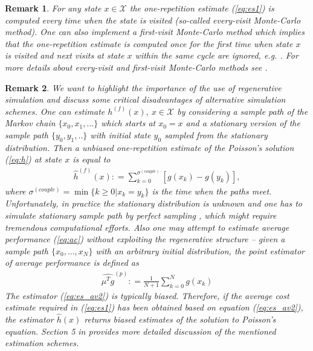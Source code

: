 \documentclass[11pt]{article}
\newcommand{\X}{\mathcal{X}}
\newtheorem{remark}{Remark}
\theoremstyle{definition}
\numberwithin{equation}{section}
\begin{document}
\begin{remark}
For any state $x\in \X$ the one-repetition estimate (\ref{eq:es1}) is computed every time when the state is visited (so-called \textit{every-visit} Monte-Carlo method). One can also implement a \textit{first-visit}  Monte-Carlo method which implies that the one-repetition estimate is computed once for the first time when state $x$ is visited and next visits at state $x$ within the same cycle are ignored, e.g. \cite{Cao1999}. For more details about every-visit and first-visit Monte-Carlo methods see \cite[Section 5.1]{Sutton2018}.
\end{remark}


\begin{remark}
We want to highlight the importance of the use of  regenerative simulation  and discuss some critical disadvantages of alternative simulation schemes.  One can estimate  $h^{(f)}(x),~x\in \X$  by considering a sample path of the Markov chain $\{x_0, x_1, ...\}$ which starts at $x_0 = x$  and a stationary version of the sample path $\{y_0, y_1, ..\}$ with initial state $y_0$ sampled from the stationary distribution. Then a unbiased one-repetition estimate of the Poisson's solution  (\ref{eq:h})  at state $x$ is equal to
\begin{align*}
\hat h^{(f)}(x): = \sum\limits_{k=0}^{\sigma^{(couple)} }\left[g(x_k) - g(y_k)\right],
\end{align*}
where $\sigma^{(couple)} = \min\{k\geq 0| x_k = y_k\}$ is the time when the paths meet. Unfortunately, in practice the stationary distribution is unknown and one has to simulate stationary sample path by \textit{perfect sampling} \cite{Propp1996}, which might require tremendous computational efforts.  
Also one may attempt to estimate average performance (\ref{eq:ac}) without exploiting the regenerative structure  -- given a sample path $\{x_0, ..., x_N\}$ with an arbitrary initial distribution,  the point estimator of   average performance is defined as
\begin{align}\label{eq:es_av2}
\widehat{\mu^T  g} ^{(p)} : =\frac{1 }{N+1}\sum\limits_{k=0}^{N}g(x_k) 
\end{align}
The estimator (\ref{eq:es_av2}) is typically biased. Therefore,   if   the average cost estimate required in (\ref{eq:es1}) has been obtained based on equation (\ref{eq:es_av2}), the estimator $\hat h (x)$ returns biased estimates of the solution to Poisson's equation.  
Section 5 in \cite{Cooper2003} provides more detailed discussion  of the mentioned estimation schemes.
\end{remark}
\end{document}
